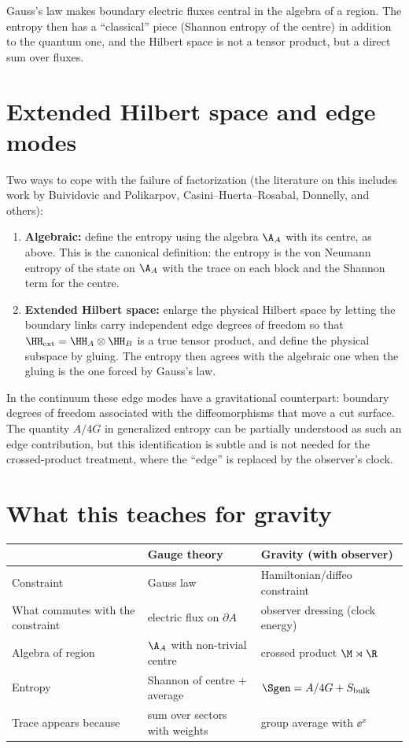 \begin{keyidea}
Gauss's law makes boundary electric fluxes central in the algebra of a region. The entropy then has a ``classical'' piece (Shannon entropy of the centre) in addition to the quantum one, and the Hilbert space is not a tensor product, but a direct sum over fluxes.
\end{keyidea}

\section{Extended Hilbert space and edge modes}

Two ways to cope with the failure of factorization (the literature on this includes work by Buividovic and Polikarpov, Casini--Huerta--Rosabal, Donnelly, and others):
\begin{enumerate}
\item \textbf{Algebraic:} define the entropy using the algebra $\A_A$ with its centre, as above. This is the canonical definition: the entropy is the von Neumann entropy of the state on $\A_A$ with the trace on each block and the Shannon term for the centre.
\item \textbf{Extended Hilbert space:} enlarge the physical Hilbert space by letting the boundary links carry independent edge degrees of freedom so that $\HH_{\rm ext}=\HH_A\otimes\HH_B$ is a true tensor product, and define the physical subspace by gluing. The entropy then agrees with the algebraic one when the gluing is the one forced by Gauss's law.
\end{enumerate}
In the continuum these edge modes have a gravitational counterpart: boundary degrees of freedom associated with the diffeomorphisms that move a cut surface. The quantity $A/4G$ in generalized entropy can be partially understood as such an edge contribution, but this identification is subtle and is not needed for the crossed-product treatment, where the ``edge'' is replaced by the observer's clock.

\section{What this teaches for gravity}

\begin{center}
\renewcommand{\arraystretch}{1.3}
\begin{tabular}{@{}p{4cm}p{4cm}p{4.2cm}@{}}
\toprule
 & Gauge theory & Gravity (with observer)\\
\midrule
Constraint & Gauss law & Hamiltonian/diffeo constraint\\
What commutes with the constraint & electric flux on $\partial A$ & observer dressing (clock energy)\\
Algebra of region & $\A_A$ with non-trivial centre & crossed product $\M\rtimes\R$\\
Entropy & Shannon of centre $+$ average & $\Sgen=A/4G+S_{\rm bulk}$\\
Trace appears because & sum over sectors with weights & group average with $\ee^{x}$\\
\bottomrule
\end{tabular}
\end{center}

